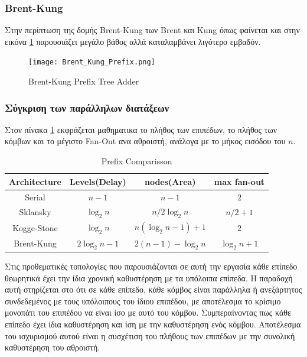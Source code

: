 \subsubsection*{Brent-Kung}
Στην περίπτωση της δομής Brent-Kung των Βrent και Kung \cite{Brent:1982:RLP:1309296.1309891}
όπως φαίνεται και στην εικόνα \ref{BrentKungTree} παρουσιάζει μεγάλο βάθος αλλά καταλαμβάνει
λιγότερο εμβαδόν.
\begin{figure}[H]
    \centering
    \texttt{[image: Brent\_Kung\_Prefix.png]}
    \caption{Brent-Kung Prefix Tree Adder}
    \label{BrentKungTree}
\end{figure}




\subsubsection*{Σύγκριση των παράλληλων διατάξεων}

Στον πίνακα \ref{Prefix_Comparison} εκφράζεται μαθηματικα το πλήθος των επιπέδων, το πλήθος των 
κόμβων και το μέγιστο Fan-Out ανα αθροιστή, ανάλογα με το μήκος εισόδου του $n$.
\begin{table}[H]
\centering
     \begin{tabular}{  c c c c  } 

        \hline
        Architecture & Levels(Delay) & nodes(Area) & max fan-out\\
        \hline
        
        Serial &
        $n-1$ &
        $n-1$ &
        $2$\\
        
        Sklansky &
        $\log_2 n$ &
        $n/2\log_2n$ &
        $n/2+1$\\
        
        Kogge-Stone &
        $\log_2n$ &
        $n(\log_2n-1)+1$ &
        $2$\\
        
        Brent-Kung &
        $2\log_2n-1$ &
        $ 2(n-1) - \log_2n $ &
        $\log_2n+1$\\
        
        \hline

    \end{tabular}

\caption{Prefix Comparisson}
\label{Prefix_Comparison}
\end{table}
Στις προθεματικές τοπολογίες που παρουσιάζονται σε αυτή την εργασία κάθε επίπεδο θεωρητικά έχει 
την ίδια χρονική καθυστέρηση με τα υπόλοιπα επίπεδα. Η παραδοχή αυτή στηρίζεται στο ότι 
σε κάθε επίπεδο, κάθε κόμβος είναι παράλληλα ή ανεξάρτητος συνδεδεμένος με τους υπόλοιπους
του ίδιου επιπέδου, με αποτέλεσμα το κρίσιμο μονοπάτι του επιπέδου να είναι ίσο με αυτό του
κόμβου. Συμπεραίνοντας πως κάθε επίπεδο έχει ίδια καθυστέρηση και ίση με την καθυστέρηση
ενός κόμβου. Αποτέλεσμα του ισχυρισμού αυτού είναι η συσχέτιση του πλήθους των επιπέδων με 
την συνολική καθυστέρηση του αθροιστή.

